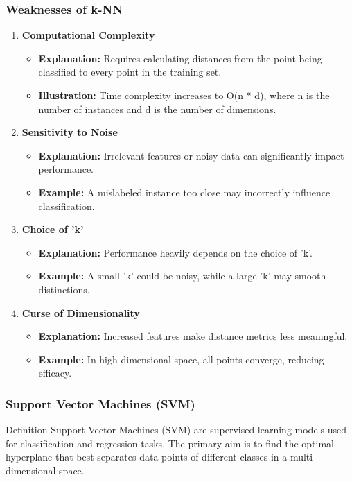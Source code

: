 \documentclass[aspectratio=169]{beamer}
\begin{document}
\begin{frame}[fragile]
    \frametitle{Weaknesses of k-NN}
    \begin{enumerate}
        \item \textbf{Computational Complexity}
        \begin{itemize}
            \item \textbf{Explanation:} Requires calculating distances from the point being classified to every point in the training set.
            \item \textbf{Illustration:} Time complexity increases to O(n * d), where n is the number of instances and d is the number of dimensions.
        \end{itemize}

        \item \textbf{Sensitivity to Noise}
        \begin{itemize}
            \item \textbf{Explanation:} Irrelevant features or noisy data can significantly impact performance.
            \item \textbf{Example:} A mislabeled instance too close may incorrectly influence classification.
        \end{itemize}

        \item \textbf{Choice of 'k'}
        \begin{itemize}
            \item \textbf{Explanation:} Performance heavily depends on the choice of 'k'.
            \item \textbf{Example:} A small 'k' could be noisy, while a large 'k' may smooth distinctions.
        \end{itemize}

        \item \textbf{Curse of Dimensionality}
        \begin{itemize}
            \item \textbf{Explanation:} Increased features make distance metrics less meaningful.
            \item \textbf{Example:} In high-dimensional space, all points converge, reducing efficacy.
        \end{itemize}
    \end{enumerate}
\end{frame}

\begin{frame}[fragile]
    \frametitle{Support Vector Machines (SVM)}
    \begin{block}{Definition}
        Support Vector Machines (SVM) are supervised learning models used for classification and regression tasks. The primary aim is to find the optimal hyperplane that best separates data points of different classes in a multi-dimensional space.
    \end{block}
\end{frame}
\end{document}
